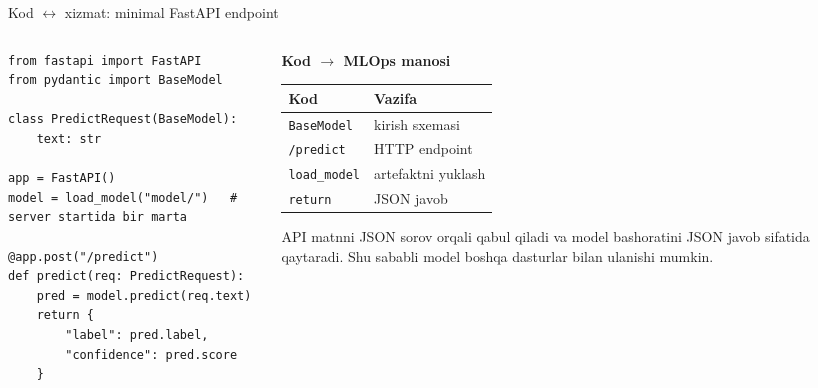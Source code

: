 \documentclass[aspectratio=169,11pt]{beamer}
\newcommand{\uzq}{\textquotesingle{}}   %
\begin{document}
\begin{frame}[fragile]{Kod $\leftrightarrow$ xizmat: minimal FastAPI endpoint}
  \small

  \begin{columns}[T,totalwidth=\textwidth]
    \begin{column}{0.59\textwidth}
\begin{lstlisting}[basicstyle=\ttfamily\scriptsize]
from fastapi import FastAPI
from pydantic import BaseModel

class PredictRequest(BaseModel):
    text: str

app = FastAPI()
model = load_model("model/")   # server startida bir marta

@app.post("/predict")
def predict(req: PredictRequest):
    pred = model.predict(req.text)
    return {
        "label": pred.label,
        "confidence": pred.score
    }
\end{lstlisting}
    \end{column}

    \begin{column}{0.38\textwidth}
      \textbf{Kod $\to$ MLOps ma\uzq{}nosi}\\[3pt]

      \footnotesize
      \renewcommand{\arraystretch}{1.12}
      \begin{tabular}{p{1.75cm}p{2.05cm}}
        \toprule
        \textbf{Kod} & \textbf{Vazifa} \\
        \midrule
        \texttt{BaseModel} & kirish sxemasi \\
        \texttt{/predict} & HTTP endpoint \\
        \texttt{load\_model} & artefaktni yuklash \\
        \texttt{return} & JSON javob \\
        \bottomrule
      \end{tabular}

      \vspace{5pt}

      \begin{tcolorbox}[okbox,top=2pt,bottom=2pt,left=3pt,right=3pt]
        \footnotesize
        API matnni JSON so\uzq{}rov orqali qabul qiladi va model bashoratini
        JSON javob sifatida qaytaradi. Shu sababli model boshqa dasturlar
        bilan ulanishi mumkin.
      \end{tcolorbox}
    \end{column}
  \end{columns}
\end{frame}
\end{document}
